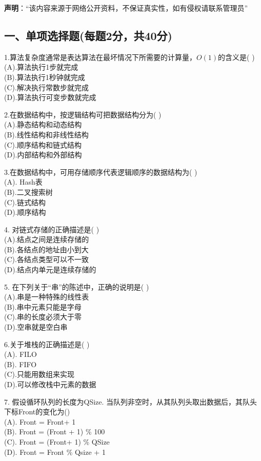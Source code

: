 
\textbf{声明}：“该内容来源于网络公开资料，不保证真实性，如有侵权请联系管理员”

\subsection{一、单项选择题(每题2分，共40分)}

1.算法复杂度通常是表达算法在最坏情况下所需要的计算量，$O(1)$的含义是( ) \\
(A).算法执行1步就完成 \\
(B).算法执行1秒钟就完成 \\
(C).解决执行常数步就完成 \\
(D).算法执行可变步数就完成

2.在数据结构中，按逻辑结构可把数据结构分为( ) \\
(A).静态结构和动态结构 \\
(B).线性结构和非线性结构 \\
(C).顺序结构和链式结构 \\
(D).内部结构和外部结构

3.在数据结构中，可用存储顺序代表逻辑顺序的数据结构为( ) \\
(A). Hash表 \\
(B).二叉搜索树 \\
(C).链式结构 \\
(D).顺序结构

4. 对链式存储的正确描述是( ) \\
(A).结点之间是连续存储的 \\
(B).各结点的地址由小到大 \\
(C).各结点类型可以不一致 \\
(D).结点内单元是连续存储的

5. 在下列关于“串”的陈述中，正确的说明是( ) \\
(A).串是一种特殊的线性表 \\
(B).串中元素只能是字母 \\
(C).串的长度必须大于零 \\
(D).空串就是空白串

6.关于堆栈的正确描述是( ) \\
(A). FILO \\
(B). FIFO \\
(C).只能用数组来实现 \\
(D).可以修改栈中元素的数据

7. 假设循环队列的长度为QSize. 当队列非空时，从其队列头取出数据后，其队头下标Front的变化为() \\
(A). Front = Front+ 1 \\
(B). Front = (Front + 1) \% 100 \\
(C). Front = (Front+ 1) \% QSize \\
(D). Front = Front \% Qsize + 1

